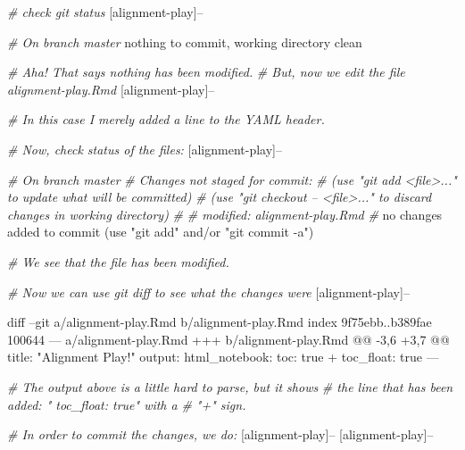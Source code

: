 \documentclass[]{krantz}
\makeatletter
\newenvironment{Shaded}{\begin{snugshade}}{\end{snugshade}}
\newcommand{\CommentTok}[1]{\textcolor[rgb]{0.37,0.37,0.37}{\textit{#1}}}
\newcommand{\ExtensionTok}[1]{#1}
\newcommand{\FunctionTok}[1]{\textcolor[rgb]{0,0,0}{#1}}
\newcommand{\NormalTok}[1]{#1}
\newcommand{\StringTok}[1]{\textcolor[rgb]{0.5,0.5,0.5}{#1}}
\newenvironment{kframe}{%
\medskip{}
\setlength{\fboxsep}{.8em}
 \def\at@end@of@kframe{}%
 \ifinner\ifhmode%
  \def\at@end@of@kframe{\end{minipage}}%
  \begin{minipage}{\columnwidth}%
 \fi\fi%
 \def\FrameCommand##1{\hskip\@totalleftmargin \hskip-\fboxsep
 \colorbox{shadecolor}{##1}\hskip-\fboxsep
     \hskip-\linewidth \hskip-\@totalleftmargin \hskip\columnwidth}%
 \MakeFramed {\advance\hsize-\width
   \@totalleftmargin\z@ \linewidth\hsize
   \@setminipage}}%
 {\par\unskip\endMakeFramed%
 \at@end@of@kframe}
\renewenvironment{Shaded}{\begin{kframe}}{\end{kframe}}
\makeatother
\begin{document}
\begin{Shaded}
\begin{Highlighting}[]
\CommentTok{# check git status}
\NormalTok{[}\ExtensionTok{alignment-play}\NormalTok{]--%

\CommentTok{# On branch master}
\ExtensionTok{nothing}\NormalTok{ to commit, working directory clean}

\CommentTok{# Aha! That says nothing has been modified.}
\CommentTok{# But, now we edit the file alignment-play.Rmd}
\NormalTok{[}\ExtensionTok{alignment-play}\NormalTok{]--%

\CommentTok{# In this case I merely added a line to the YAML header.}

\CommentTok{# Now, check status of the files:}
\NormalTok{[}\ExtensionTok{alignment-play}\NormalTok{]--%

\CommentTok{# On branch master}
\CommentTok{# Changes not staged for commit:}
\CommentTok{#   (use "git add <file>..." to update what will be committed)}
\CommentTok{#   (use "git checkout -- <file>..." to discard changes in working directory)}
\CommentTok{#}
\CommentTok{#   modified:   alignment-play.Rmd}
\CommentTok{#}
\ExtensionTok{no}\NormalTok{ changes added to commit (use }\StringTok{"git add"}\NormalTok{ and/or }\StringTok{"git commit -a"}\NormalTok{)}

\CommentTok{# We see that the file has been modified.}

\CommentTok{# Now we can use git diff to see what the changes were}
\NormalTok{[}\ExtensionTok{alignment-play}\NormalTok{]--%

\FunctionTok{diff}\NormalTok{ --git a/alignment-play.Rmd b/alignment-play.Rmd}
\ExtensionTok{index}\NormalTok{ 9f75ebb..b389fae 100644}
\ExtensionTok{---}\NormalTok{ a/alignment-play.Rmd}
\ExtensionTok{+++}\NormalTok{ b/alignment-play.Rmd}
\ExtensionTok{@@}\NormalTok{ -3,6 +3,7 @@ title: }\StringTok{"Alignment Play!"}
 \ExtensionTok{output}\NormalTok{: }
   \ExtensionTok{html_notebook}\NormalTok{:}
     \ExtensionTok{toc}\NormalTok{: true}
\ExtensionTok{+}\NormalTok{    toc_float: true}
 \ExtensionTok{---}
 
\CommentTok{# The output above is a little hard to parse, but it shows}
\CommentTok{# the line that has been added: "  toc_float: true" with a}
\CommentTok{# "+" sign.}

\CommentTok{# In order to commit the changes, we do:}
\NormalTok{[}\ExtensionTok{alignment-play}\NormalTok{]--%
\NormalTok{[}\ExtensionTok{alignment-play}\NormalTok{]--%

}}}}}}
\end{Highlighting}
\end{Shaded}
\end{document}
